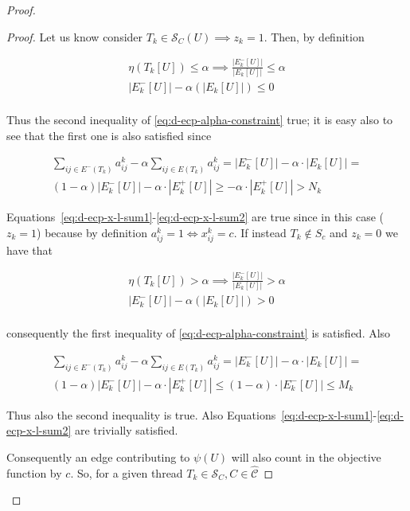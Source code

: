 \begin{proof}
\begin{proof}
		Let us know consider $T_k \in \mathcal{S}_C(U) \implies z_k = 1$. Then, by definition

		\begin{gather}
			\eta(T_k[U]) \leq \alpha \implies
			\frac{|E^{-}_{k}[U]|}{|E_{k}[U]|} \leq \alpha \\
			|E^{-}_{k}[U]| - \alpha (|E_{k}[U]|) \leq 0 \\
		\end{gather}

		Thus the second inequality of \autoref{eq:d-ecp-alpha-constraint} true;
		it is easy also to see that the first one is also satisfied since

		\begin{multline}
			\sum^{}_{ij \in E^{-} (T_k)} a_{ij}^{k}  - \alpha \sum^{}_{ij \in E(T_k)}
			a_{ij} ^{k} = |E^{-}_{k}[U]| - \alpha \cdot |E_{k}[U]| = \\
			(1- \alpha)|E^{-}_{k}[U]| - \alpha \cdot |E^{+}_{k}[U]| \geq -
			\alpha \cdot |E^{+}_{k}[U]| > N_k
		\end{multline}

		Equations~\ref{eq:d-ecp-x-l-sum1}-\ref{eq:d-ecp-x-l-sum2} are true
		since in this case ($z_k = 1$) because by definition $a_{ij}^{k} = 1
			\iff x_{ij}^{k} = c$. If instead $T_k \not\in S_c$ and $z_k = 0$ we
		have that

		\begin{gather}
			\eta(T_k[U]) > \alpha \implies
			\frac{|E^{-}_{k}[U]|}{|E_{k}[U]|} > \alpha \\
			|E^{-}_{k}[U]| - \alpha (|E_{k}[U]|) > 0 \\
		\end{gather}

		consequently the first inequality of
		\autoref{eq:d-ecp-alpha-constraint} is satisfied. Also

		\begin{multline}
			\sum^{}_{ij \in E^{-} (T_k)} a_{ij}^{k}  - \alpha \sum^{}_{ij \in E(T_k)}
			a_{ij} ^{k} = |E^{-}_{k}[U]| - \alpha \cdot |E_{k}[U]| = \\
			(1- \alpha)|E^{-}_{k}[U]| - \alpha \cdot |E^{+}_{k}[U]| \leq
			(1 -\alpha) \cdot |E^{-}_{k}[U]| \leq M_k
		\end{multline}

		Thus also the second inequality is true. Also
		Equations~\ref{eq:d-ecp-x-l-sum1}-\ref{eq:d-ecp-x-l-sum2} are trivially
		satisfied.

		\bigskip
		Consequently an edge contributing to $\psi(U)$ will also count in the
		objective function by $c$. So, for a given thread $T_k \in \mathcal{S}_C, C \in \mathcal{\hat{C}}$


\end{proof}
\end{proof}
